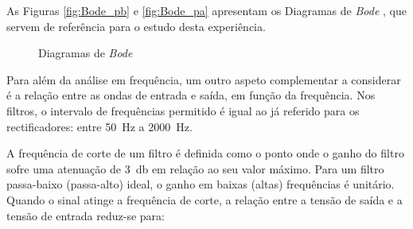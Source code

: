 As Figuras \ref{fig:Bode_pb} e \ref{fig:Bode_pa} apresentam os Diagramas de \textit{Bode} , que servem de referência para o estudo desta experiência. 

\begin{figure}[hbtp]
	\centering%
		\centering
		\qquad
		\caption{Diagramas de \textit{Bode}  \cite{sedrasmith}}%
		\label{fig:Bodeesqgeral}%
	\end{figure}

	Para além da análise em frequência, um outro aspeto complementar a considerar é a relação entre as ondas de entrada e saída, em função da frequência. Nos filtros, o intervalo de frequências permitido é igual ao já referido para os rectificadores: entre \SI{50}{\hertz} a \SI{2000}{\hertz}. 
	
	A frequência de corte de um filtro é definida como o ponto onde o ganho do filtro sofre uma atenuação de \SI{3}{\decibel} em relação ao seu valor máximo. 	Para um filtro passa-baixo (passa-alto) ideal, o ganho em baixas (altas) frequências é unitário. Quando o sinal atinge a frequência de corte, a relação entre a tensão de saída e a tensão de entrada reduz-se para:  
	
